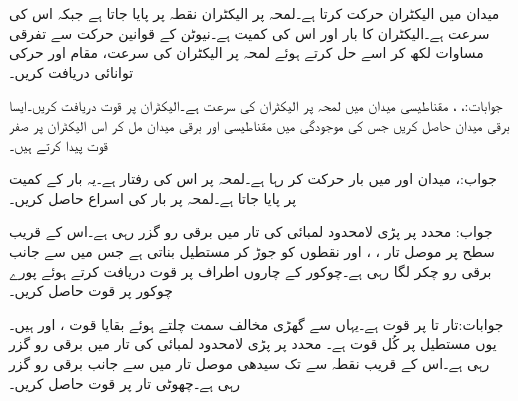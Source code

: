 \newpage
{}
میدان  میں الیکٹران  حرکت کرتا ہے۔لمحہ  پر الیکٹران نقطہ  پر پایا جاتا ہے جبکہ اس کی سرعت  ہے۔الیکٹران کا بار  اور اس کی کمیت  ہے۔نیوٹن کے قوانین حرکت سے تفرقی مساوات لکھ کر اسے حل کرتے ہوئے لمحہ  پر الیکٹران کی سرعت، مقام اور حرکی توانائی دریافت کریں۔

جوابات:، ، 
مقناطیسی میدان  میں لمحہ  پر الیکٹران کی سرعت  ہے۔الیکٹران پر قوت دریافت کریں۔ایسا برقی میدان حاصل کریں جس کی موجودگی میں مقناطیسی اور برقی میدان مل کر اس الیکٹران پر صفر قوت  پیدا کرتے ہیں۔

جواب:، 
میدان  اور  میں بار  حرکت کر رہا ہے۔لمحہ  پر اس کی رفتار  ہے۔یہ بار  کے کمیت پر پایا جاتا ہے۔لمحہ  پر بار کی اسراع حاصل کریں۔

جواب:
محدد  پر پڑی لامحدود لمبائی کی تار میں  برقی رو گزر رہی ہے۔اس کے قریب سطح  پر موصل تار ، ،  اور  نقطوں کو جوڑ کر مستطیل بناتی ہے جس میں  سے  جانب  برقی رو چکر  لگا رہی ہے۔چوکور کے چاروں اطراف پر قوت دریافت کرتے ہوئے پورے چوکور پر قوت حاصل کریں۔

جوابات:تار  تا  پر قوت  ہے۔یہاں سے گھڑی مخالف سمت چلتے ہوئے بقایا قوت  ،  اور  ہیں۔یوں مستطیل پر کُل قوت  ہے۔
محدد  پر پڑی لامحدود لمبائی کی تار میں  برقی رو گزر رہی ہے۔اس کے قریب نقطہ  سے  تک سیدھی موصل تار میں  سے  جانب  برقی رو گزر رہی ہے۔چھوٹی تار پر قوت حاصل کریں۔

